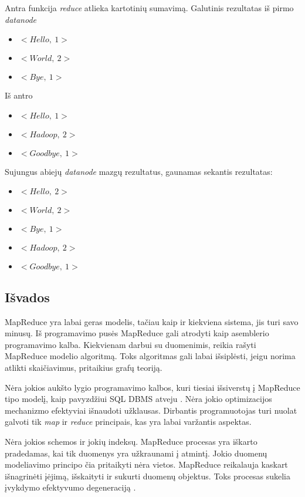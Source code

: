 \documentclass[10pt]{IEEEtran}
\begin{document}
		Antra funkcija \textit{reduce} atlieka kartotinių sumavimą. Galutinis rezultatas iš pirmo \textit{datanode}

		\begin{itemize}
			\item $<Hello,~1>$
			\item $<World,~2>$
			\item $<Bye,~1>$
		\end{itemize}

		Iš antro

		\begin{itemize}
			\item $<Hello,~1>$
			\item $<Hadoop,~2>$
			\item $<Goodbye,~1>$
		\end{itemize}

		Sujungus abiejų \textit{datanode} mazgų rezultatus, gaunamas sekantis rezultatas:

		\begin{itemize}
			\item $<Hello,~2>$
			\item $<World,~2>$
			\item $<Bye,~1>$
			\item $<Hadoop,~2>$
			\item $<Goodbye,~1>$
		\end{itemize}

	\subsection{Išvados}

		MapReduce yra labai geras modelis, tačiau kaip ir kiekviena sistema, jis turi savo minusų. Iš programavimo pusės MapReduce gali atrodyti kaip asemblerio programavimo kalba. Kiekvienam darbui su duomenimis, reikia rašyti MapReduce modelio algoritmą. Toks algoritmas gali labai išsiplėsti, jeigu norima atlikti skaičiavimus, pritaikius grafų teoriją.

		Nėra jokios aukšto lygio programavimo kalbos, kuri tiesiai išsiverstų į MapReduce tipo modelį, kaip pavyzdžiui SQL DBMS atveju \cite{lee2012parallel}. Nėra jokio optimizacijos mechanizmo efektyviai išnaudoti užklausas. Dirbantis programuotojas turi nuolat galvoti tik \textit{map} ir \textit{reduce} principais, kas yra labai varžantis aspektas.

		Nėra jokios schemos ir jokių indeksų. MapReduce procesas yra iškarto pradedamas, kai tik duomenys yra užkraunami į atmintį. Jokio duomenų modeliavimo principo čia pritaikyti nėra vietos. MapReduce reikalauja kaskart išnagrinėti įėjimą, išskaityti ir sukurti duomenų objektus. Toks procesas sukelia įvykdymo efektyvumo degeneraciją \cite{pavlo2009comparison}.
\end{document}
